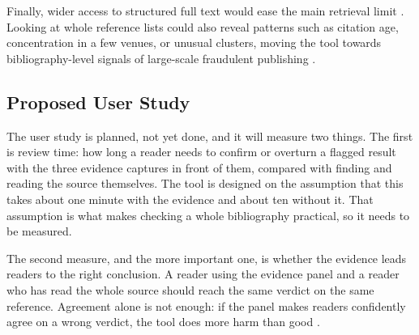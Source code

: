 \documentclass{article}
\begin{document}
Finally, wider access to structured full text would ease the main retrieval limit \cite{piwowar2018,europepmc2015}. Looking at whole reference lists could also reveal patterns such as citation age, concentration in a few venues, or unusual clusters, moving the tool towards bibliography-level signals of large-scale fraudulent publishing \cite{else2021,cabanac2021prev,byrne2017}.


\subsection{Proposed User Study}
\label{sec:user}

The user study is planned, not yet done, and it will measure two things. The first is review time: how long a reader needs to confirm or overturn a flagged result with the three evidence captures in front of them, compared with finding and reading the source themselves. The tool is designed on the assumption that this takes about one minute with the evidence and about ten without it. That assumption is what makes checking a whole bibliography practical, so it needs to be measured.

The second measure, and the more important one, is whether the evidence leads readers to the right conclusion. A reader using the evidence panel and a reader who has read the whole source should reach the same verdict on the same reference. Agreement alone is not enough: if the panel makes readers confidently agree on a wrong verdict, the tool does more harm than good \cite{liang2024}.
\end{document}
